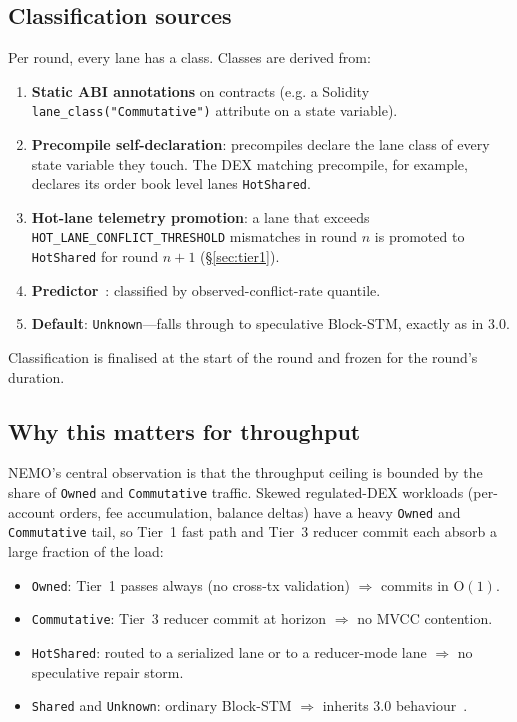 \subsection{Classification sources}

Per round, every lane has a class. Classes are derived from:
\begin{enumerate}[leftmargin=2em]
\item \textbf{Static ABI annotations} on contracts (e.g. a Solidity
      \texttt{lane\_class("Commutative")} attribute on a state
      variable).
\item \textbf{Precompile self-declaration}: precompiles declare the
      lane class of every state variable they touch. The DEX matching
      precompile, for example, declares its order book level lanes
      \texttt{HotShared}.
\item \textbf{Hot-lane telemetry promotion}: a lane that exceeds
      \texttt{HOT\_LANE\_CONFLICT\_THRESHOLD} mismatches in round $n$
      is promoted to \texttt{HotShared} for round $n+1$
      (\S\ref{sec:tier1}).
\item \textbf{Predictor}~\cite{foresight2025}: classified by
      observed-conflict-rate quantile.
\item \textbf{Default}: \texttt{Unknown}---falls through to speculative
      Block-STM, exactly as in 3.0.
\end{enumerate}

Classification is finalised at the start of the round and frozen for
the round's duration.

\subsection{Why this matters for throughput}

NEMO's central observation is that the throughput ceiling is bounded by
the share of \texttt{Owned} and \texttt{Commutative} traffic. Skewed
regulated-DEX workloads (per-account orders, fee accumulation, balance
deltas) have a heavy \texttt{Owned} and \texttt{Commutative} tail, so
Tier~1 fast path and Tier~3 reducer commit each absorb a large
fraction of the load:

\begin{itemize}[leftmargin=2em]
\item \texttt{Owned}: Tier~1 passes always (no cross-tx validation)
      $\Rightarrow$ commits in O$(1)$.
\item \texttt{Commutative}: Tier~3 reducer commit at horizon
      $\Rightarrow$ no MVCC contention.
\item \texttt{HotShared}: routed to a serialized lane or to a
      reducer-mode lane $\Rightarrow$ no speculative repair storm.
\item \texttt{Shared} and \texttt{Unknown}: ordinary Block-STM
      $\Rightarrow$ inherits 3.0 behaviour~\cite{lp010-quasarstm-3}.
\end{itemize}

